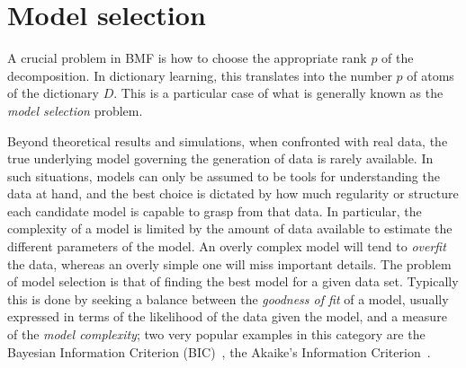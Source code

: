 \documentclass[twocolumn]{IEEEtran}
\theoremstyle{definition}
\begin{document}
%
% 
%

\section{Model selection}
\label{sec:model-selection}

A crucial problem in BMF is how to choose the appropriate rank $p$ of the decomposition. In dictionary learning, this translates into the number $p$ of atoms of the dictionary $D$. This is a particular case of what is generally known as the \emph{model selection} problem. 

Beyond theoretical results and simulations, when confronted with real data, 
the true underlying model governing the generation of data is rarely available. In such situations, models can only be assumed to be tools for understanding the data at hand, and the best choice is dictated by how much regularity or structure each candidate model is capable to grasp from that data. In particular, the complexity of a model is limited by the amount of data available to estimate the different parameters of the model. An overly complex model will tend to \emph{overfit} the data, whereas an overly simple one will miss important details. The problem of model selection is that of finding the best model for a given data set. Typically this is done by seeking a balance between the \emph{goodness of fit} of a model, usually expressed in terms of the likelihood of the data given the model, and a measure of the \emph{model complexity}; two very popular examples in this category are the Bayesian Information Criterion (BIC)~\cite{bic}, the Akaike's Information Criterion~\cite{aic}. 
\end{document}
